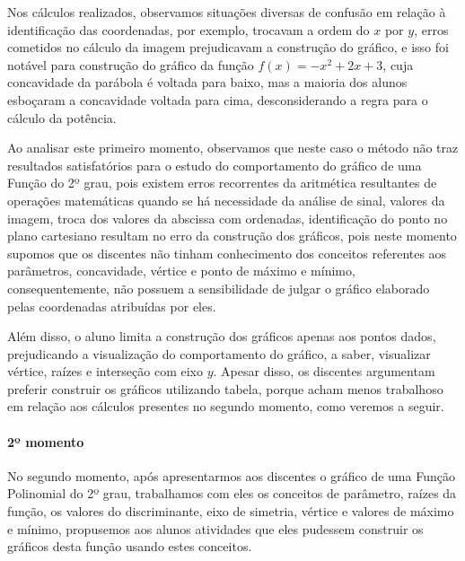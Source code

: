 \begin{refsection}
    Nos cálculos realizados, observamos situações diversas de confusão em relação à identificação das coordenadas, por exemplo, trocavam a ordem do $x$ por $y$, erros cometidos no cálculo da imagem prejudicavam a construção do gráfico, e isso foi notável para construção do gráfico da função $f(x)= -x^2 + 2x + 3$, cuja concavidade da parábola é voltada para baixo, mas a maioria dos alunos esboçaram a concavidade voltada para cima, desconsiderando a regra para o cálculo da potência.

    Ao analisar este primeiro momento, observamos que neste caso o método não traz resultados satisfatórios para o estudo do comportamento do gráfico de uma Função do 2º grau, pois existem erros recorrentes da aritmética resultantes de operações matemáticas quando se há necessidade da análise de sinal, valores da imagem, troca dos valores da abscissa com ordenadas, identificação do ponto no plano cartesiano resultam no erro da construção dos gráficos, pois neste momento supomos que os discentes não tinham conhecimento dos conceitos referentes aos parâmetros, concavidade, vértice e ponto de máximo e mínimo, consequentemente, não possuem a sensibilidade de julgar o gráfico elaborado pelas coordenadas atribuídas por eles. 

    Além disso, o aluno limita a construção dos gráficos apenas aos pontos dados, prejudicando a visualização do comportamento do gráfico, a saber, visualizar vértice, raízes e interseção com eixo $y$. Apesar disso, os discentes argumentam preferir construir os gráficos utilizando tabela, porque acham menos trabalhoso em relação aos cálculos presentes no segundo momento, como veremos a seguir. 

    \paragraph{2º momento} No segundo momento, após apresentarmos aos discentes o gráfico de uma Função Polinomial do 2º grau, trabalhamos com eles os conceitos de parâmetro, raízes da função, os valores do discriminante, eixo de simetria, vértice e valores de máximo e mínimo, propusemos aos alunos atividades que eles pudessem construir os gráficos desta função usando estes conceitos. 


\end{refsection}
